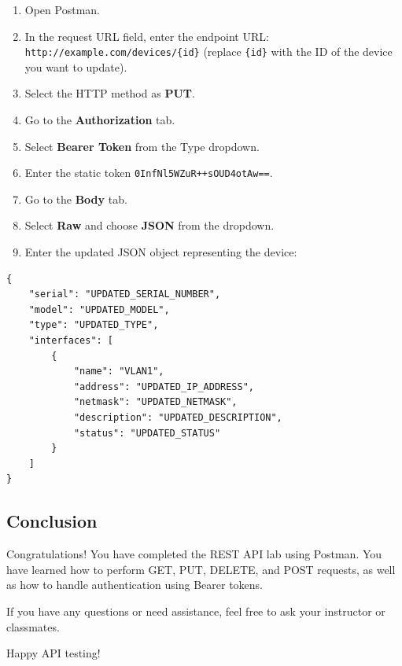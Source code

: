 \documentclass[11pt,a4paper]{article}
\providecommand{\tightlist}{%
  \setlength{\itemsep}{0pt}\setlength{\parskip}{0pt}}
\begin{document}
\begin{enumerate}
\def\labelenumi{\arabic{enumi}.}
\tightlist
\item
  Open Postman.
\item
  In the request URL field, enter the endpoint URL:
  \texttt{http://example.com/devices/\{id\}} (replace \texttt{\{id\}}
  with the ID of the device you want to update).
\item
  Select the HTTP method as \textbf{PUT}.
\item
  Go to the \textbf{Authorization} tab.
\item
  Select \textbf{Bearer Token} from the Type dropdown.
\item
  Enter the static token \texttt{0InfNl5WZuR++sOUD4otAw==}.
\item
  Go to the \textbf{Body} tab.
\item
  Select \textbf{Raw} and choose \textbf{JSON} from the dropdown.
\item
  Enter the updated JSON object representing the device:
\end{enumerate}

\begin{verbatim}
{
    "serial": "UPDATED_SERIAL_NUMBER",
    "model": "UPDATED_MODEL",
    "type": "UPDATED_TYPE",
    "interfaces": [
        {
            "name": "VLAN1",
            "address": "UPDATED_IP_ADDRESS",
            "netmask": "UPDATED_NETMASK",
            "description": "UPDATED_DESCRIPTION",
            "status": "UPDATED_STATUS"
        }
    ]
}
\end{verbatim}

\subsection{Conclusion}\label{conclusion}

Congratulations! You have completed the REST API lab using Postman. You
have learned how to perform GET, PUT, DELETE, and POST requests, as well
as how to handle authentication using Bearer tokens.

If you have any questions or need assistance, feel free to ask your
instructor or classmates.

Happy API testing!
\end{document}
